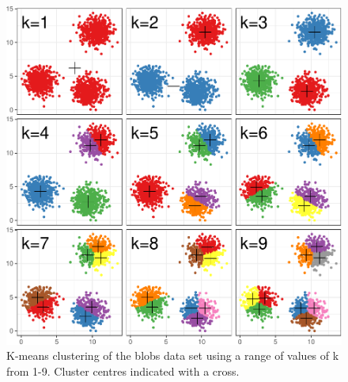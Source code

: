\documentclass[]{book}
\newenvironment{Shaded}{\begin{snugshade}}{\end{snugshade}}
\newcommand{\KeywordTok}[1]{\textcolor[rgb]{0.13,0.29,0.53}{\textbf{{#1}}}}
\newcommand{\DataTypeTok}[1]{\textcolor[rgb]{0.13,0.29,0.53}{{#1}}}
\newcommand{\StringTok}[1]{\textcolor[rgb]{0.31,0.60,0.02}{{#1}}}
\newcommand{\NormalTok}[1]{{#1}}
\theoremstyle{definition}
\theoremstyle{definition}
\theoremstyle{definition}
\theoremstyle{remark}
\begin{document}
\begin{figure}

{\centering \includegraphics[width=1\linewidth]{09-clustering_files/figure-latex/kmeansRangeK-1} 

}

\caption{K-means clustering of the blobs data set using a range of values of k from 1-9. Cluster centres indicated with a cross.}\label{fig:kmeansRangeK}
\end{figure}

\begin{Shaded}
\end{Shaded}
\end{document}
